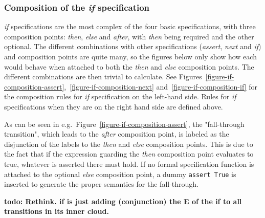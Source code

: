 \documentclass[a4paper,11pt]{kth-mag}
\newcommand{\todo}[1]{\textbf{todo: #1}}
\begin{document}
\subsubsection{Composition of the \textit{if} specification}

\textit{if} specifications are the most complex of the four basic
specifications, with three composition points: \textit{then}, \textit{else} and
\textit{after}, with \textit{then} being required and the other optional. The
different combinations with other specifications (\textit{assert},
\textit{next} and \textit{if}) and composition points are quite many, so the
figures below only show how each would behave when attached to both the
\textit{then} and \textit{else} composition points. The different combinations
are then trivial to calculate. See
Figures~\ref{figure-if-composition-assert},~\ref{figure-if-composition-next}
and~\ref{figure-if-composition-if} for the composition rules for \textit{if}
specification on the left-hand side. Rules for \textit{if} specifications when
they are on the right hand side are defined above.

As can be seen in e.g.\ Figure~\ref{figure-if-composition-assert}, the
"fall-through transition", which leads to the \textit{after} composition point,
is labeled as the disjunction of the labels to the \textit{then} and
\textit{else} composition points. This is due to the fact that if the
expression guarding the \textit{then} composition point evaluates to true,
whatever is asserted there must hold. If no formal specification function is
attached to the optional \textit{else} composition point, a dummy
\texttt{assert True} is inserted to generate the proper semantics for the
fall-through.


\todo{Rethink. if is just adding (conjunction) the E of the if to all
transitions in its inner cloud.}
\end{document}
